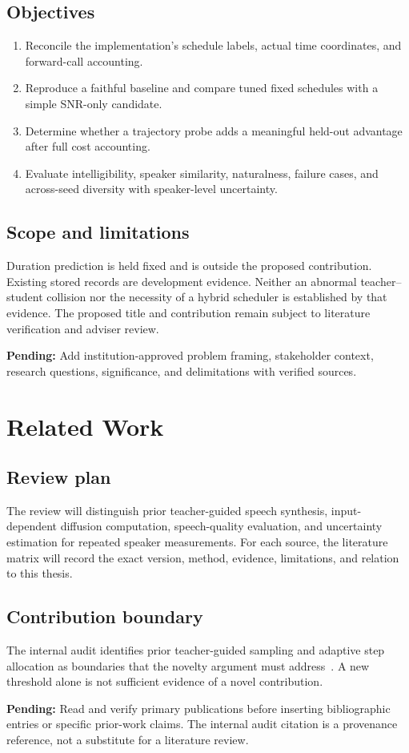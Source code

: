\documentclass[12pt,a4paper,oneside]{report}
\newcommand{\pending}[1]{\par\noindent\textbf{Pending:} #1\par}
\begin{document}
\section{Objectives}
\begin{enumerate}
\item Reconcile the implementation's schedule labels, actual time coordinates, and forward-call accounting.
\item Reproduce a faithful baseline and compare tuned fixed schedules with a simple SNR-only candidate.
\item Determine whether a trajectory probe adds a meaningful held-out advantage after full cost accounting.
\item Evaluate intelligibility, speaker similarity, naturalness, failure cases, and across-seed diversity with speaker-level uncertainty.
\end{enumerate}
\section{Scope and limitations}
Duration prediction is held fixed and is outside the proposed contribution. Existing stored records are development evidence. Neither an abnormal teacher--student collision nor the necessity of a hybrid scheduler is established by that evidence. The proposed title and contribution remain subject to literature verification and adviser review.
\pending{Add institution-approved problem framing, stakeholder context, research questions, significance, and delimitations with verified sources.}
\chapter{Related Work}
\label{ch:related}
\section{Review plan}
The review will distinguish prior teacher-guided speech synthesis, input-dependent diffusion computation, speech-quality evaluation, and uncertainty estimation for repeated speaker measurements. For each source, the literature matrix will record the exact version, method, evidence, limitations, and relation to this thesis.
\section{Contribution boundary}
The internal audit identifies prior teacher-guided sampling and adaptive step allocation as boundaries that the novelty argument must address~\cite{internal-audit-2026}. A new threshold alone is not sufficient evidence of a novel contribution.
\pending{Read and verify primary publications before inserting bibliographic entries or specific prior-work claims. The internal audit citation is a provenance reference, not a substitute for a literature review.}
\end{document}
